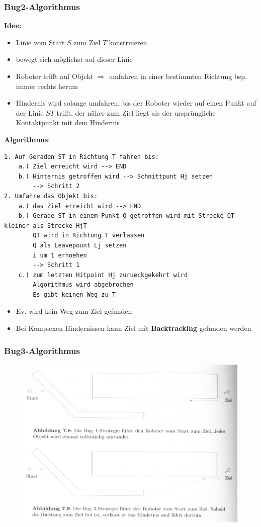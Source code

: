 \subsubsection{Bug2-Algorithmus}
\textbf{Idee:}
\begin{itemize}
	\item Linie vom Start $S$ zum Ziel $T$ konstruieren
	\item bewegt sich möglichst auf dieser Linie
	\item Roboter trifft auf Objekt $\Rightarrow$ umfahren in einer bestimmten Richtung bsp. immer rechts herum
	\item Hindernis wird solange umfahren, bis der Roboter wieder auf einen Punkt auf der Linie $ST$ trifft, der näher zum Ziel liegt als der ursprüngliche Kontaktpunkt mit dem Hindernis
\end{itemize}
\textbf{Algorithmus}:
\begin{lstlisting}
1. Auf Geraden ST in Richtung T fahren bis:
	a.) Ziel erreicht wird --> END
	b.) Hinternis getroffen wird --> Schnittpunt Hj setzen
		--> Schritt 2
2. Umfahre das Objekt bis:
	a.) das Ziel erreicht wird --> END
	b.) Gerade ST in einem Punkt Q getroffen wird mit Strecke QT kleiner als Strecke HjT
		QT wird in Richtung T verlassen
		Q als Leavepount Lj setzen
		i um 1 erhoehen
		--> Schritt 1
	c.) zum letzten Hitpoint Hj zurueckgekehrt wird
		Algorithmus wird abgebrochen
		Es gibt keinen Weg zu T
\end{lstlisting}
\begin{itemize}
	\item Ev. wird kein Weg zum Ziel gefunden
\end{itemize}
\begin{itemize}
	\item Bei Komplexen Hindernissen kann Ziel mit \textbf{Backtracking} gefunden werden
\end{itemize}
\subsubsection{Bug3-Algorithmus}
\begin{figure}[H]
	\begin{center}
		\includegraphics[scale=0.6]{Resources/PNG/Bug3.PNG}
		\caption{}
		\label{fig:PNG/Bug3.PNG}
	\end{center}
\end{figure}
